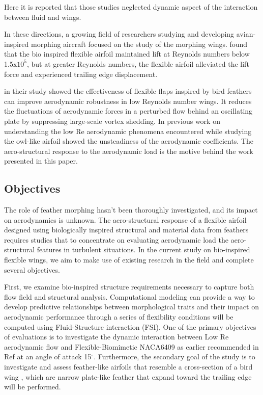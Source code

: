 Here it is reported that those studies neglected dynamic aspect of the interaction between fluid and wings.

In these directions, a growing ﬁeld of researchers studying and developing avian-inspired morphing aircraft focused on the study of the morphing wings. \citet{Gamble2020a} found that the bio inspired flexible airfoil maintained lift at Reynolds numbers below 1.5x$10^5$, but at greater Reynolds numbers, the flexible airfoil alleviated the lift force and experienced trailing edge displacement.

\citet{Murayama2021} in their study showed the effectiveness of flexible flaps inspired by bird feathers can improve aerodynamic robustness in low Reynolds number wings. It reduces the fluctuations of aerodynamic forces in a perturbed flow behind an oscillating plate by suppressing large-scale vortex shedding. 
In previous work on understanding the low Re aerodynamic phenomena encountered while studying the owl-like airfoil \cite{Boughou2022} showed the unsteadiness of the aerodynamic coefficients. The aero-structural response to the aerodynamic load is the motive behind the work presented in this paper.

\subsection{Objectives}
The role of feather morphing hasn't been thoroughly investigated, and its impact on aerodynamics is unknown. 
The aero-structural response of a flexible airfoil designed using biologically inspired structural and material data from feathers requires studies that to concentrate on evaluating aerodynamic load the aero-structural features in turbulent situations. In the current study on bio-inspired flexible wings, we aim to make use of existing research in the field and complete several objectives. 

First, we examine bio-inspired structure requirements  necessary to capture both flow field and structural analysis. 
Computational modeling can provide a way to develop predictive relationships between morphological traits and their impact on aerodynamic performance through a series of flexibility conditions will be computed using Fluid-Structure interaction (FSI).
One of the primary objectives of evaluations is to investigate the dynamic interaction between Low Re aerodynamic flow and Flexible-Biomimetic NACA6409 as earlier recommended in Ref \cite{Gamble2020b} at an angle of attack 15$^{\circ}$. 
Furthermore, the secondary goal of the study is to investigate  and assess  feather-like airfoils that resemble a cross-section of a bird wing \cite{Murayama2021}, which are narrow plate-like feather that expand toward the trailing edge will be performed. 